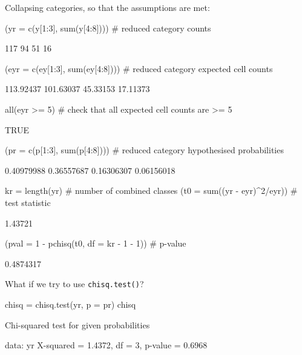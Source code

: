 \documentclass[a4paper]{article}\usepackage[]{graphicx}\usepackage[]{xcolor}
\begin{document}
Collapsing categories, so that the assumptions are met:
\begin{Schunk}
\begin{Sinput}
(yr = c(y[1:3], sum(y[4:8])))  # reduced category counts
\end{Sinput}
\begin{Soutput}
[1] 117  94  51  16
\end{Soutput}
\begin{Sinput}
(eyr = c(ey[1:3], sum(ey[4:8])))  # reduced category expected cell counts
\end{Sinput}
\begin{Soutput}
[1] 113.92437 101.63037  45.33153  17.11373
\end{Soutput}
\begin{Sinput}
all(eyr >= 5)  # check that all expected cell counts are >= 5
\end{Sinput}
\begin{Soutput}
[1] TRUE
\end{Soutput}
\begin{Sinput}
(pr = c(p[1:3], sum(p[4:8])))  # reduced category hypothesised probabilities
\end{Sinput}
\begin{Soutput}
[1] 0.40979988 0.36557687 0.16306307 0.06156018
\end{Soutput}
\begin{Sinput}
kr = length(yr)  # number of combined classes
(t0 = sum((yr - eyr)^2/eyr))  # test statistic
\end{Sinput}
\begin{Soutput}
[1] 1.43721
\end{Soutput}
\begin{Sinput}
(pval = 1 - pchisq(t0, df = kr - 1 - 1))  # p-value
\end{Sinput}
\begin{Soutput}
[1] 0.4874317
\end{Soutput}
\end{Schunk}
What if we try to use \lstinline|chisq.test()|?
\begin{Schunk}
\begin{Sinput}
chisq = chisq.test(yr, p = pr)
chisq
\end{Sinput}
\begin{Soutput}

	Chi-squared test for given probabilities

data:  yr
X-squared = 1.4372, df = 3, p-value = 0.6968
\end{Soutput}
\end{Schunk}
\end{document}
